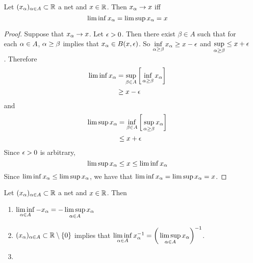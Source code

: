\documentclass{book}
\begin{document}
	\begin{ex} 
		Let $(x_{\alpha})_{\alpha \in A} \subset \mathbb{R}$ a net and $x \in \mathbb{R}$. Then $x_{\alpha} \rightarrow x$ iff $$\liminf x_{\alpha} = \limsup x_{\alpha} = x$$
	\end{ex}

	\begin{proof}
		Suppose that $x_{\alpha} \rightarrow x$. Let $\epsilon >0$. Then there exist $\beta \in A$ such that for each $\alpha \in A$, $\alpha \geq \beta$ implies that $x_{\alpha} \in B(x, \epsilon)$. So $\inf\limits_{\alpha \geq \beta} x_{\alpha} \geq x - \epsilon$ and $\sup\limits_{\alpha \geq \beta} \leq x + \epsilon$. Therefore 
		\begin{align*}
			\liminf x_{\alpha} 
			&= \sup_{\beta \in A} \bigg[ \inf_{\alpha \geq \beta} x_{\alpha} \bigg] \\
			& \geq x - \epsilon \\
		\end{align*}
		and 
		\begin{align*}
			\limsup x_{\alpha} 
			&= \inf_{\beta \in A} \bigg[ \sup_{\alpha \geq \beta} x_{\alpha} \bigg] \\
			& \leq x + \epsilon \\
		\end{align*}
		Since $\epsilon >0$ is arbitrary, $$\limsup x_{\alpha} \leq x \leq \liminf x_{\alpha}$$
		Since $\liminf x_{\alpha} \leq \limsup x_{\alpha}$, we have that $\liminf x_{\alpha} = \limsup x_{\alpha} = x$.
	\end{proof}

	\begin{ex} 
		Let $(x_{\alpha})_{\alpha \in A} \subset \mathbb{R}$ a net and $x \in \mathbb{R}$. Then
		\begin{enumerate}
			\item $\liminf\limits_{\alpha \in A} -x_{\alpha} = - \limsup\limits_{\alpha \in A} x_{\alpha}$
			\item $(x_{\alpha})_{\alpha \in A} \subset \mathbb{R} \setminus \{0\}$ implies that $\liminf\limits_{\alpha \in A} x_{\alpha}^{-1} = \bigg(\limsup\limits_{\alpha \in A} x_{\alpha} \bigg)^{-1}$.
			\item {}
		\end{enumerate}
	\end{ex}
\end{document}
